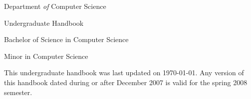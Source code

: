 \documentclass[12pt,twoside]{article}
\newcommand{\textsize}{\Large}
\newcommand{\textsize}{\normalsize}
\begin{document}
\pagestyle{empty}
\vspace*{1in}

\begin{centering}
\Huge


\vspace*{1in}

Department {\em of}\/ Computer Science

\bigskip

Undergraduate Handbook

\vspace{1in}

\LARGE
Bachelor of Science in Computer Science

Minor in Computer Science

\end{centering}

\textsize

\newpage

\vspace*{3in}

\begin{centering}

This undergraduate handbook was\linebreak
last updated on \today. \linebreak
\linebreak\linebreak\linebreak
Any version of this handbook dated\linebreak
during or after December 2007 is\linebreak
valid for the spring 2008 semester.\linebreak

\end{centering}

\newpage

\pagestyle{fancy}


\tableofcontents

\newpage


\end{document}
